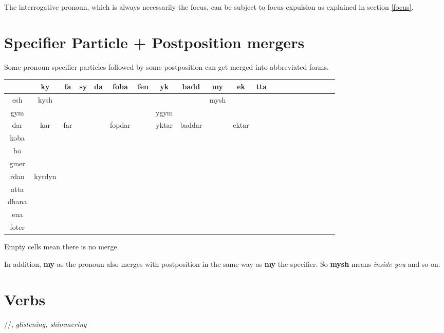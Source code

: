 \documentclass[10pt,oneside]{memoir}
\newcommand{\ipa}[1]{/\textipa{#1}/}
\begin{document}
The interrogative pronoun, which is always necessarily the focus, can be subject to focus expulsion as explained in section \ref{focus}.

\pagebreak

\section{Specifier Particle + Postposition mergers}\label{mergers}

Some pronoun specifier particles followed by some postposition can get merged into abbreviated forms.

\begin{center}
\begin{tabular}[]{c|*{20}{|c}|}
    & ky & fa & sy & da & foba & fen & yk & badd & my   & ek & tta \\\hline\hline
esh & kysh &  &    &    &      &     &    &      & mysh &    &     \\\hline
gym &    &    &    &    &      &     &ygym&      &      &    &     \\\hline
dar & kar & far &  &  & fopdar &  & yktar & baddar &  & ektar &  \\\hline
koba & & & & & & & & & & &\\\hline
bo\\\hline
gmer\\\hline
rdan & kyrdyn\\\hline
atta\\\hline
dhana\\\hline
ena \\\hline
foter\\\hline
\end{tabular}
\end{center}

Empty cells mean there is no merge.

In addition, \textbf{my} as the pronoun also merges with postposition in the same way as \textbf{my} the specifier. So \textbf{mysh} means \emph{inside you} and so on.

\pagebreak

\section{Verbs}\label{verbs}


\begin{center}
	\ipa{deN\~o"nak}, \emph{glistening, shimmering}
\end{center}
\end{document}
